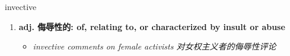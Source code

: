 
\begin{frame}
{\huge invective}
\begin{center}
\begin{enumerate}\Large
  \item \textbf{adj. 侮辱性的: of, relating to, or characterized by insult or abuse}
  \begin{itemize}
    \item \em{\Large{invective comments on female activists 对女权主义者的侮辱性评论}}
  \end{itemize}
\end{enumerate}
\end{center}
\end{frame}
